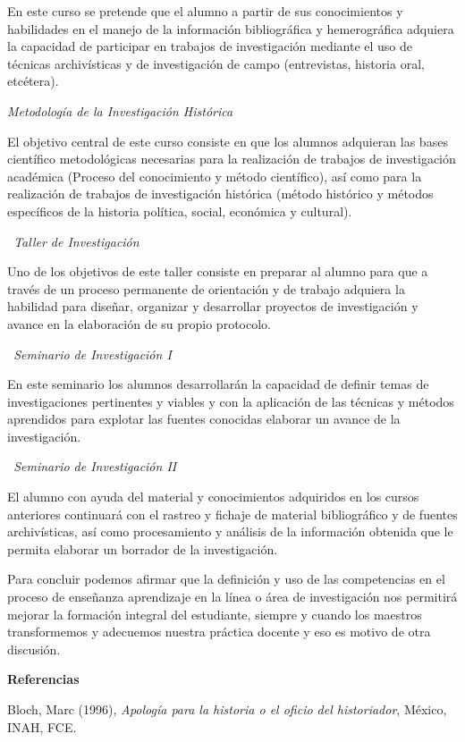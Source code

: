 En este curso se pretende que el alumno a partir de sus conocimientos y 
habilidades en el manejo de la información bibliográfica y 
hemerográfica adquiera la capacidad de participar en trabajos de 
investigación mediante el uso de técnicas archivísticas y de 
investigación de campo (entrevistas, historia oral, etcétera).

\textit{Metodología de la Investigación Histórica} 

\enlargethispage{1\baselineskip}
El objetivo central de este curso consiste en que los alumnos adquieran 
las bases científico metodológicas necesarias para la realización de 
trabajos de investigación académica (Proceso del conocimiento y método 
científico), así como para la realización de trabajos de investigación 
histórica (método histórico y métodos específicos de la historia política, 
social, económica y cultural).


{\itshape\ Taller de  Investigación\/}

Uno de los objetivos de este taller consiste en preparar al alumno para 
que a través de un proceso permanente de orientación y de trabajo 
adquiera la habilidad para diseñar, organizar y desarrollar proyectos 
de investigación y avance en la elaboración de su propio protocolo.

{\itshape\ Seminario de Investigación I\/}

En este seminario los alumnos desarrollarán la capacidad de definir 
temas de investigaciones pertinentes y viables y con la aplicación de 
las técnicas y métodos aprendidos para explotar las fuentes conocidas 
elaborar un avance de la investigación.  

{\itshape\ Seminario de Investigación II\/}

El alumno con ayuda del material y conocimientos adquiridos en los 
cursos anteriores continuará con el rastreo y fichaje de material 
bibliográfico y de fuentes archivísticas, así como procesamiento y 
análisis de la información obtenida que le permita elaborar un borrador 
de la investigación.

Para concluir podemos afirmar que la definición y uso de las 
competencias en el proceso de enseñanza aprendizaje en la línea o área 
de investigación nos permitirá mejorar la formación integral del 
estudiante, siempre y cuando los maestros transformemos y adecuemos 
nuestra práctica docente y eso es motivo de otra discusión.

\bigskip
{\bfseries Referencias}

\medskip
Bloch, Marc (1996), \textit{Apología para la historia o el oficio del
historiador}, México, INAH, FCE\@.

